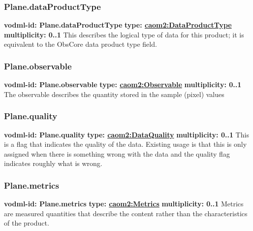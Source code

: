     \subsubsection{Plane.dataProductType}
      \textbf{vodml-id: Plane.dataProductType} \newline
      \textbf{type: \hyperref[sect:DataProductType]{caom2:DataProductType}} \newline
      \textbf{multiplicity: 0..1} \newline
      This describes the logical type of data for this product; it is equivalent to the ObsCore data product type field.

    \subsubsection{Plane.observable}
      \textbf{vodml-id: Plane.observable} \newline
      \textbf{type: \hyperref[sect:Observable]{caom2:Observable}} \newline
      \textbf{multiplicity: 0..1} \newline
      The observable describes the quantity stored in the sample (pixel) values

    \subsubsection{Plane.quality}
      \textbf{vodml-id: Plane.quality} \newline
      \textbf{type: \hyperref[sect:DataQuality]{caom2:DataQuality}} \newline
      \textbf{multiplicity: 0..1} \newline
      This is a flag that indicates the quality of the data. Existing usage is that this is only assigned when there is something wrong with the data and the quality flag indicates roughly what is wrong.

    \subsubsection{Plane.metrics}
      \textbf{vodml-id: Plane.metrics} \newline
      \textbf{type: \hyperref[sect:Metrics]{caom2:Metrics}} \newline
      \textbf{multiplicity: 0..1} \newline
      Metrics are measured quantities that describe the content rather than the characteristics of the product.

